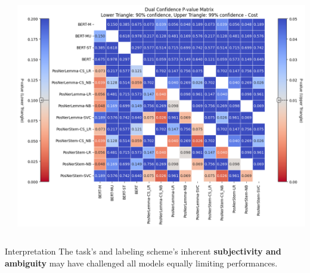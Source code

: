 \documentclass[aspectratio=169]{beamer}
\begin{document}
\begin{frame}
\begin{columns}[T]
\begin{column}{0.45\textwidth}
    \end{column}
    \begin{column}{0.45\textwidth}
      \centering
      \includegraphics[width=\textwidth]{rsc/multiclass_statistical_tests2.png}
    \end{column}
  \end{columns}
  
  \begin{alertblock}{Interpretation}
    The task's and labeling scheme's inherent \textbf{subjectivity and ambiguity} may have challenged all models equally limiting performances.
  \end{alertblock}
\end{frame}
\end{document}
